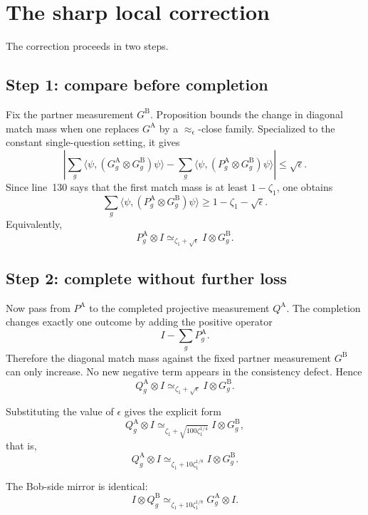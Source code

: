 \documentclass[11pt]{article}
\begin{document}
\section{The sharp local correction}

The correction proceeds in two steps.

\subsection*{Step 1: compare before completion}

Fix the partner measurement $G^{\mathrm B}$.  Proposition
 bounds the change in diagonal match
mass when one replaces $G^{\mathrm A}$ by a $\approx_{\epsilon}$-close family.
Specialized to the constant single-question setting, it gives
\[
  \left|
    \sum_g \langle \psi,
      (G^{\mathrm A}_g \otimes G^{\mathrm B}_g)\psi\rangle
    -
    \sum_g \langle \psi,
      (P^{\mathrm A}_g \otimes G^{\mathrm B}_g)\psi\rangle
  \right|
  \le \sqrt{\epsilon}.
\]
Since line~130 says that the first match mass is at least $1-\zeta_1$, one
obtains
\[
  \sum_g \langle \psi,
    (P^{\mathrm A}_g \otimes G^{\mathrm B}_g)\psi\rangle
  \ge 1 - \zeta_1 - \sqrt{\epsilon}.
\]
Equivalently,
\[
  P^{\mathrm A}_g \otimes I
  \simeq_{\zeta_1 + \sqrt{\epsilon}}
  I \otimes G^{\mathrm B}_g.
\]

\subsection*{Step 2: complete without further loss}

Now pass from $P^{\mathrm A}$ to the completed projective measurement
$Q^{\mathrm A}$.  The completion changes exactly one outcome by adding the
positive operator
\[
  I - \sum_g P^{\mathrm A}_g.
\]
Therefore the diagonal match mass against the fixed partner measurement
$G^{\mathrm B}$ can only increase.  No new negative term appears in the
consistency defect.  Hence
\[
  Q^{\mathrm A}_g \otimes I
  \simeq_{\zeta_1 + \sqrt{\epsilon}}
  I \otimes G^{\mathrm B}_g.
\]

Substituting the value of $\epsilon$ gives the explicit form
\[
  Q^{\mathrm A}_g \otimes I
  \simeq_{\zeta_1 + \sqrt{100\zeta_1^{1/4}}}
  I \otimes G^{\mathrm B}_g,
\]
that is,
\[
  Q^{\mathrm A}_g \otimes I
  \simeq_{\zeta_1 + 10\zeta_1^{1/8}}
  I \otimes G^{\mathrm B}_g.
  \tag{sharper repaired line 169}
\]

The Bob-side mirror is identical:
\[
  I \otimes Q^{\mathrm B}_g
  \simeq_{\zeta_1 + 10\zeta_1^{1/8}}
  G^{\mathrm A}_g \otimes I.
\]
\end{document}
